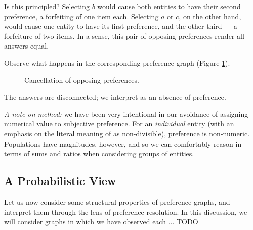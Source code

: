 Is this principled?
Selecting $b$ would cause both entities to have their second preference, a forfeiting of one item each.
Selecting $a$ or $c$, on the other hand, would cause one entity to have its first preference, and the other third --- a forfeiture of two items.
In a sense, this pair of opposing preferences render all answers equal.

Observe what happens in the corresponding preference graph (Figure \ref{fig:elements_agg_opposing}).

\begin{figure}[!htb]
\centering
{}
\hspace{5mm}
\raisebox{2 cm}{$\rightarrow$}
\hspace{5mm}
\hfill
\caption{Cancellation of opposing preferences.}
\label{fig:elements_agg_opposing}
\end{figure}

The answers are disconnected; we interpret as an absence of preference.

\bigskip

\textit{A note on method:} we have been very intentional in our avoidance of assigning numerical value to subjective preference.
For an \textit{individual} entity (with an emphasis on the literal meaning of  as non-divisible), preference is non-numeric.
Populations have magnitudes, however, and so we can comfortably reason in terms of sums and ratios when considering groups of entities.

\subsection{A Probabilistic View}

Let us now consider some structural properties of preference graphs, and interpret them through the lens of preference resolution.
In this discussion, we will consider graphs in which we have observed each ... TODO

